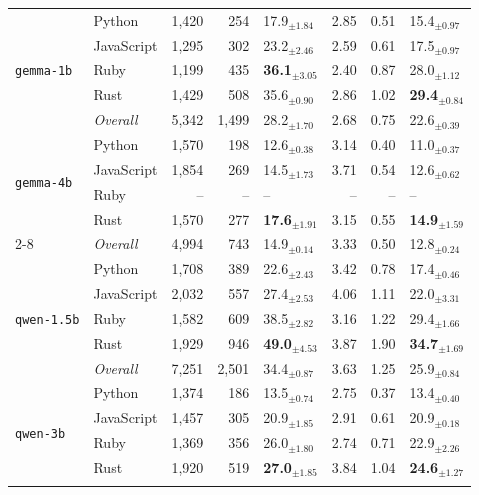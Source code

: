 \begin{longtable}{@{}llrrp{0.72cm}rrp{0.72cm}@{}}
    \midrule
      \multirow{5}{*}{\texttt{gemma-1b}} & Python & 1,420 & 254 & 17.9$_{\pm 1.84}$ & 2.85 & 0.51 & 15.4$_{\pm 0.97}$ \\
       & JavaScript & 1,295 & 302 & 23.2$_{\pm 2.46}$ & 2.59 & 0.61 & 17.5$_{\pm 0.97}$ \\
       & Ruby & 1,199 & 435 & \textbf{36.1$_{\pm 3.05}$} & 2.40 & 0.87 & 28.0$_{\pm 1.12}$ \\
       & Rust & 1,429 & 508 & 35.6$_{\pm 0.90}$ & 2.86 & 1.02 & \textbf{29.4$_{\pm 0.84}$} \\ \cmidrule(lr){2-8}
      & \textit{Overall} & 5,342 & 1,499 & 28.2$_{\pm 1.70}$ & 2.68 & 0.75 & 22.6$_{\pm 0.39}$ \\
    \midrule
      \multirow{4}{*}{\texttt{gemma-4b}} & Python & 1,570 & 198 & 12.6$_{\pm 0.38}$ & 3.14 & 0.40 & 11.0$_{\pm 0.37}$ \\
       & JavaScript & 1,854 & 269 & 14.5$_{\pm 1.73}$ & 3.71 & 0.54 & 12.6$_{\pm 0.62}$ \\
       & Ruby & -- & -- & -- & -- & -- & -- \\
       & Rust & 1,570 & 277 & \textbf{17.6$_{\pm 1.91}$} & 3.15 & 0.55 & \textbf{14.9$_{\pm 1.59}$} \\ \cmidrule(lr){2-8}
      & \textit{Overall} & 4,994 & 743 & 14.9$_{\pm 0.14}$ & 3.33 & 0.50 & 12.8$_{\pm 0.24}$ \\
    \midrule
      \multirow{5}{*}{\texttt{qwen-1.5b}} & Python & 1,708 & 389 & 22.6$_{\pm 2.43}$ & 3.42 & 0.78 & 17.4$_{\pm 0.46}$ \\
       & JavaScript & 2,032 & 557 & 27.4$_{\pm 2.53}$ & 4.06 & 1.11 & 22.0$_{\pm 3.31}$ \\
       & Ruby & 1,582 & 609 & 38.5$_{\pm 2.82}$ & 3.16 & 1.22 & 29.4$_{\pm 1.66}$ \\
       & Rust & 1,929 & 946 & \textbf{49.0$_{\pm 4.53}$} & 3.87 & 1.90 & \textbf{34.7$_{\pm 1.69}$} \\ \cmidrule(lr){2-8}
      & \textit{Overall} & 7,251 & 2,501 & 34.4$_{\pm 0.87}$ & 3.63 & 1.25 & 25.9$_{\pm 0.84}$ \\
    \midrule
      \multirow{5}{*}{\texttt{qwen-3b}} & Python & 1,374 & 186 & 13.5$_{\pm 0.74}$ & 2.75 & 0.37 & 13.4$_{\pm 0.40}$ \\
       & JavaScript & 1,457 & 305 & 20.9$_{\pm 1.85}$ & 2.91 & 0.61 & 20.9$_{\pm 0.18}$ \\
       & Ruby & 1,369 & 356 & 26.0$_{\pm 1.80}$ & 2.74 & 0.71 & 22.9$_{\pm 2.26}$ \\
       & Rust & 1,920 & 519 & \textbf{27.0$_{\pm 1.85}$} & 3.84 & 1.04 & \textbf{24.6$_{\pm 1.27}$} \\ \cmidrule(lr){2-8}

\end{longtable}

